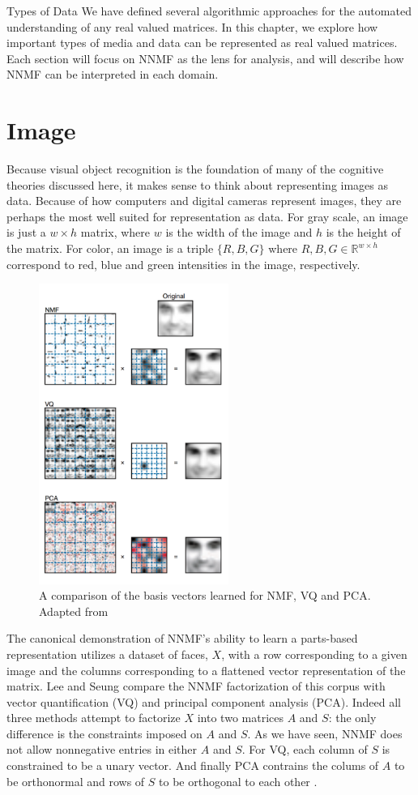 \documentclass[12pt]{pom_thesis}
\begin{document}
\begin{chapter}{Types of Data}
	We have defined several algorithmic approaches for the automated understanding of any real valued matrices. In this chapter, we explore how important types of media and data can be represented as real valued matrices. Each section will focus on NNMF as the lens for analysis, and will describe how NNMF can be interpreted in each domain. 
\section{Image}
\label{image}

Because visual object recognition is the foundation of many of the cognitive theories discussed here, it makes sense to think about representing images as data. Because of how computers and digital cameras represent images, they are perhaps the most well suited for representation as data. For gray scale, an image is just a $w \times h$ matrix, where $w$ is the width of the image and $h$ is the height of the matrix. For color, an image is a triple $\{R,B,G\}$ where $R,B,G \in \mathbb{R}^{w \times h}$ correspond to red, blue and green intensities in the image, respectively.
\begin{figure}[h]
	\label{fig:face}
	\centering
	\includegraphics[width=6.2cm]{image}
	\caption{A comparison of the basis vectors learned for NMF, VQ and PCA. Adapted from \cite{lee1999learning}}
\end{figure}
The canonical demonstration of NNMF's ability to learn a parts-based representation utilizes a dataset of faces, $X$, with a row corresponding to a given image and the columns corresponding to a flattened vector representation of the matrix. Lee and Seung compare the NNMF factorization of this corpus with vector quantification (VQ) and principal component analysis (PCA). Indeed all three methods attempt to factorize $X$ into two matrices $A$ and $S$: the only difference is the constraints imposed on $A$ and $S$. As we have seen, NNMF does not allow nonnegative entries in either $A$ and $S$. For VQ, each column of $S$ is constrained to be a unary vector. And finally PCA contrains the colums of $A$ to be orthonormal and rows of $S$ to be orthogonal to each other \cite{lee1999learning}.


\end{chapter}
\end{document}
